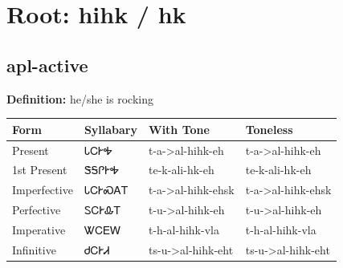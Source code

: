 \documentclass{article}%
\begin{document}
%
\normalsize%
\section*{Root: hihk / hk}%
\subsection*{apl-active}%
\textbf{Definition: }%
he/she is rocking%
\\[0.5em]%
\begin{tabular}{|l|l|l|l|}%
\hline%
\textbf{Form}&\textbf{Syllabary}&\textbf{With Tone}&\textbf{Toneless}\\%
\hline%
Present&ᏓᏟᎨᎭ&t{-}a{-}>al{-}hihk{-}eh&t{-}a{-}>al{-}hihk{-}eh\\%
1st Present&ᏕᎦᎵᎨᎭ&te{-}k{-}ali{-}hk{-}eh&te{-}k{-}ali{-}hk{-}eh\\%
Imperfective&ᏓᏟᎨᏍᎪᎢ&t{-}a{-}>al{-}hihk{-}ehsk&t{-}a{-}>al{-}hihk{-}ehsk\\%
Perfective&ᏚᏟᎨᎲᎢ&t{-}u{-}>al{-}hihk{-}eh&t{-}u{-}>al{-}hihk{-}eh\\%
Imperative&ᏔᏟᎬᎳ&t{-}h{-}al{-}hihk{-}vla&t{-}h{-}al{-}hihk{-}vla\\%
Infinitive&ᏧᏟᎨᏗ&ts{-}u{-}>al{-}hihk{-}eht&ts{-}u{-}>al{-}hihk{-}eht\\%
\hline%
\end{tabular}%
\\[1em]%
\end{document}
